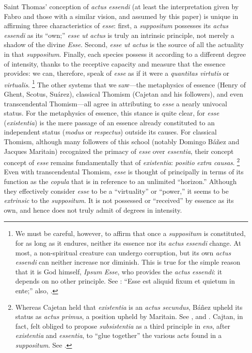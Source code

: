 Saint Thomas' conception of \emph{actus essendi} (at least the interpretation given by Fabro and those with a similar vision, and assumed by this paper) is unique in affirming three characteristics of \emph{esse}: first, a \emph{suppositum} possesses its \emph{actus essendi} as its ``own;'' \emph{esse ut actus} is truly an intrinsic principle, not merely a shadow of the divine \emph{Esse}. Second, \emph{esse ut actus} is the source of all the actuality in that \emph{suppositum}. Finally, each species possess it according to a different degree of intensity, thanks to the receptive capacity and measure that the essence provides: we can, therefore, speak of \emph{esse} as if it were a \emph{quantitas virtutis} or \emph{virtualis}.%
%
\footnote{We must be careful, however, to affirm that once a \emph{suppositum} is constituted, for as long as it endures, neither its essence nor its \emph{actus essendi} change. At most, a non-spiritual creature can undergo corruption, but its own \emph{actus essendi} can neither increase nor diminish. This is true for the simple reason that it is God himself, \emph{Ipsum Esse}, who provides the \emph{actus essendi}: it depends on no other principle. See \cite[I, cap.~20, n.~27 (Marietti n.~179)]{st:contragent}: ``Esse est aliquid fixum et quietum in ente;'' also, \cite[37]{contat:esse-essentia-ordo}.} The other systems that we saw---the metaphysics of essence (Henry of Ghent, Scotus, Suárez), classical Thomism (Cajetan and his followers), and even transcendental Thomism---all agree in attributing to \emph{esse} a nearly univocal status. For the metaphysics of essence, this stance is quite clear, for \emph{esse} (\emph{existentia}) is the mere passage of an essence already constituted to an independent status (\emph{modus} or \emph{respectus}) outside its causes. For classical Thomism, although many followers of this school (notably Domingo Báñez and Jacques Maritain) recognized the primacy of \emph{esse} over \emph{essentia}, their concept concept of \emph{esse} remains fundamentally that of \emph{existentia}: \emph{positio extra causas}.%
%
\footnote{Whereas Cajetan held that \emph{existentia} is an \emph{actus secundus}, Báñez upheld its status as \emph{actus primus}, a position upheld by Maritain. See \cite[612--613]{fabro:partecipazione}, and \cite[109-111]{contat:figure}. Cajtan, in fact, felt obliged to propose \emph{subsistentia} as a third principle in \emph{ens}, after \emph{existentia} and \emph{essentia}, to ``glue together'' the various acts found in a \emph{suppositum}. See \cite[617]{fabro:partecipazione}.} Even with transcendental Thomism, \emph{esse} is thought of principally in terms of its function as the \emph{copula} that is in reference to an unlimited ``horizon.'' Although they effectively consider \emph{esse} to be a ``virtuality'' or ``power,'' it seems to be \emph{extrinsic} to the \emph{suppositum}. It is not possessed or ``received'' by essence as its own, and hence does not truly admit of degrees in intensity.%
